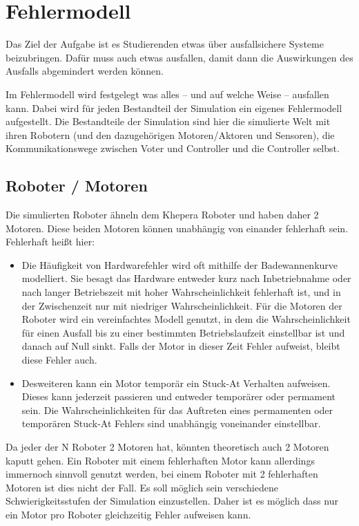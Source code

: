 \clearpage
\section{Fehlermodell}\label{fm}
Das Ziel der Aufgabe ist es Studierenden etwas {\"{u}}ber ausfallsichere Systeme beizubringen. Daf{\"{u}}r
muss auch etwas ausfallen, damit dann die Auswirkungen des Ausfalls abgemindert werden k{\"{o}}nnen.

Im Fehlermodell wird festgelegt was alles -- und auf welche Weise -- ausfallen kann. Dabei wird f{\"{u}}r jeden Bestandteil der Simulation ein eigenes Fehlermodell aufgestellt. Die Bestandteile
der Simulation sind hier die simulierte Welt mit ihren Robotern (und den dazugeh{\"{o}}rigen Motoren/Aktoren
und Sensoren), die Kommunikationswege zwischen Voter und Controller und die Controller selbst.

\subsection{Roboter / Motoren}
Die simulierten Roboter {\"{a}}hneln dem Khepera Roboter und haben daher 2 Motoren. Diese beiden Motoren k{\"{o}}nnen unabh{\"{a}}ngig von einander fehlerhaft sein. Fehlerhaft
hei{\ss}t hier:
\begin{itemize}
	\item Die H{\"{a}}ufigkeit von Hardwarefehler wird oft mithilfe der Badewannenkurve modelliert. Sie besagt das Hardware entweder kurz nach Inbetriebnahme oder nach
		langer Betriebszeit mit hoher Wahrscheinlichkeit fehlerhaft ist, und in der Zwischenzeit nur mit niedriger Wahrscheinlichkeit. F{\"{u}}r die Motoren der Roboter wird
		ein vereinfachtes Modell genutzt, in dem die Wahrscheinlichkeit f{\"{u}}r einen Ausfall bis zu einer bestimmten Betriebslaufzeit einstellbar ist und danach auf
		Null sinkt. Falls der Motor in dieser Zeit Fehler aufweist, bleibt diese Fehler auch.
	\item Desweiteren kann ein Motor tempor{\"{a}}r ein Stuck-At Verhalten aufweisen. Dieses kann jederzeit passieren und entweder tempor{\"{a}}rer oder permament sein.
		Die Wahrscheinlichkeiten f{\"{u}}r das Auftreten eines permamenten oder tempor{\"{a}}ren Stuck-At Fehlers sind unabh{\"{a}}ngig voneinander einstellbar.
\end{itemize}

Da jeder der \gls{N} Roboter 2 Motoren hat, k{\"{o}}nnten theoretisch auch 2 Motoren kaputt gehen. Ein Roboter mit einem fehlerhaften Motor kann allerdings immernoch sinnvoll genutzt werden,
bei einem Roboter mit 2 fehlerhaften Motoren ist dies nicht der Fall. Es soll m{\"{o}}glich sein verschiedene 
Schwierigkeitsstufen der Simulation einzustellen. Daher ist es m{\"{o}}glich
dass nur ein Motor pro Roboter gleichzeitig Fehler aufweisen kann.

